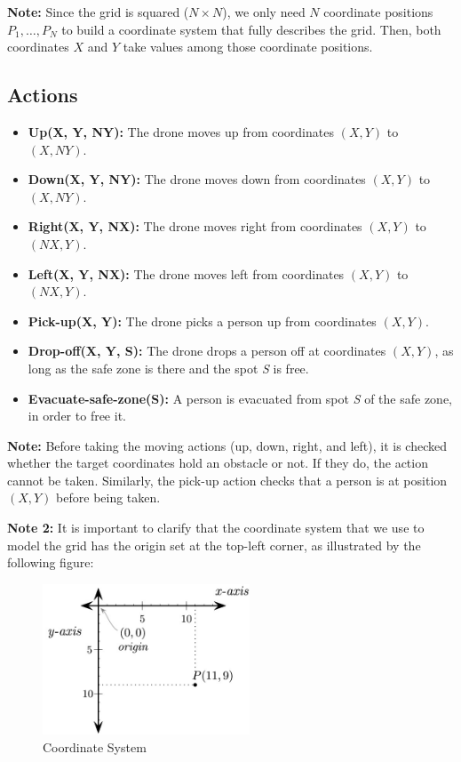 \documentclass{article}
\begin{document}
\textbf{Note:} Since the grid is squared (\(N \times N\)), we only need \(N\) coordinate positions \(P_1, \ldots, P_N\) to build a coordinate system that fully describes the grid. Then, both coordinates \(X\) and \(Y\) take values among those coordinate positions.

\subsection{Actions}\label{sec:act}

\begin{itemize}[label=--, itemsep=0.05em]
    \item \textbf{Up(X, Y, NY):} The drone moves up from coordinates \((X, Y)\) to \((X, NY)\).
    \item \textbf{Down(X, Y, NY):} The drone moves down from coordinates \((X, Y)\) to \((X, NY)\).
    \item \textbf{Right(X, Y, NX):} The drone moves right from coordinates \((X, Y)\) to \((NX, Y)\).
    \item \textbf{Left(X, Y, NX):} The drone moves left from coordinates \((X, Y)\) to \((NX, Y)\).
    \item \textbf{Pick-up(X, Y):} The drone picks a person up from coordinates \((X, Y)\).
    \item \textbf{Drop-off(X, Y, S):} The drone drops a person off at coordinates \((X, Y)\), as long as the safe zone is there and the spot \textit{S} is free.
    \item \textbf{Evacuate-safe-zone(S):} A person is evacuated from spot \textit{S} of the safe zone, in order to free it.
\end{itemize}

\textbf{Note:} Before taking the moving actions (up, down, right, and left), it is checked whether the target coordinates hold an obstacle or not. If they do, the action cannot be taken. Similarly, the pick-up action checks that a person is at position \((X, Y)\) before being taken.

\textbf{Note 2:} It is important to clarify that the coordinate system that we use to model the grid has the origin set at the top-left corner, as illustrated by the following figure:
\begin{figure}[ht]
    \centering
    \includegraphics[width=0.55\textwidth]{assets/solution_coordinates/coordinates-system.jpeg}
    \caption{Coordinate System}
    \label{fig:coord}
\end{figure}
\end{document}
